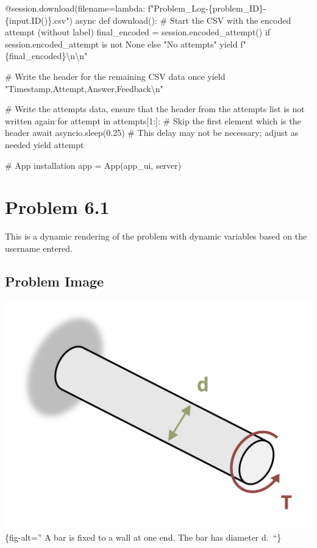 \documentclass[
  letterpaper,
  DIV=11,
  numbers=noendperiod]{scrreprt}
\newenvironment{Shaded}{\begin{snugshade}}{\end{snugshade}}
\newcommand{\NormalTok}[1]{\textcolor[rgb]{0.00,0.23,0.31}{#1}}
\begin{document}
\begin{Shaded}
\begin{Highlighting}[]
\NormalTok{    @session.download(filename=lambda: f"Problem\_Log{-}\{problem\_ID\}{-}\{input.ID()\}.csv")}
\NormalTok{    async def download():}
\NormalTok{        \# Start the CSV with the encoded attempt (without label)}
\NormalTok{        final\_encoded = session.encoded\_attempt() if session.encoded\_attempt is not None else "No attempts"}
\NormalTok{        yield f"\{final\_encoded\}\textbackslash{}n\textbackslash{}n"}
        
\NormalTok{        \# Write the header for the remaining CSV data once}
\NormalTok{        yield "Timestamp,Attempt,Answer,Feedback\textbackslash{}n"}
        
\NormalTok{        \# Write the attempts data, ensure that the header from the attempts list is not written again}
\NormalTok{        for attempt in attempts[1:]:  \# Skip the first element which is the header}
\NormalTok{            await asyncio.sleep(0.25)  \# This delay may not be necessary; adjust as needed}
\NormalTok{            yield attempt}


\NormalTok{\# App installation}
\NormalTok{app = App(app\_ui, server)}
\end{Highlighting}
\end{Shaded}

\chapter*{Problem 6.1}\label{problem-6.1}


This is a dynamic rendering of the problem with dynamic variables based
on the username entered.

\section*{Problem Image}\label{problem-image-39}


\includegraphics{images/265.png}\{fig-alt='' A bar is fixed to a wall at
one end. The bar has diameter d.~``\}
\end{document}
